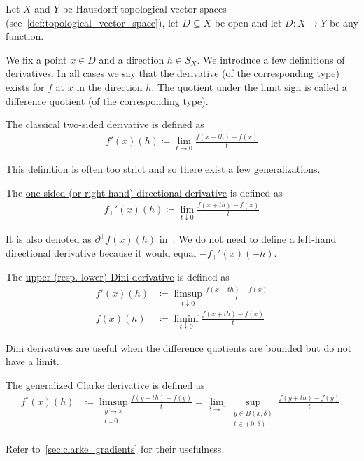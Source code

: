 Let $X$ and $Y$ be Hausdorff topological vector spaces (see~\cref{def:topological_vector_space}), let $D \subseteq X$ be open and let $D: X \to Y$ be any function.

\begin{definition}\label{def:derivatives}
  We fix a point $x \in D$ and a direction $h \in S_X$. We introduce a few definitions of derivatives. In all cases we say that \uline{the derivative (of the corresponding type) exists for $f$ at $x$ in the direction $h$}. The quotient under the limit sign is called a \uline{difference quotient} (of the corresponding type).

  \begin{defenum}
    \item\label{def:derivatives/classical} The classical \uline{two-sided derivative} is defined as
    \begin{align*}
      f'(x)(h) \coloneqq \lim_{t \to 0} \frac {f(x + th) - f(x)} t
    \end{align*}

    This definition is often too strict and so there exist a few generalizations.

    \item\label{def:derivatives/onesided}\cite[lemma 1.2]{Phelps1993} The \uline{one-sided (or right-hand) directional derivative} is defined as
    \begin{align*}
      f_+'(x)(h) \coloneqq \lim_{t \downarrow 0} \frac {f(x + th) - f(x)} t
    \end{align*}

    It is also denoted as $\partial^+ f(x)(h)$ in~\cite[lemma 1.2]{Phelps1993}. We do not need to define a left-hand directional derivative because it would equal $-f_+'(x)(-h)$.

    \item\label{def:derivatives/dini}\cite[definition 11.18]{Clarke2013} The \uline{upper (resp. lower) Dini derivative} is defined as
    \begin{align*}
      \overline f'(x)(h) &\coloneqq \limsup_{t \downarrow 0} \frac {f(x + th) - f(x)} t
      \\
      \underline f(x)(h) &\coloneqq \liminf_{t \downarrow 0} \frac {f(x + th) - f(x)} t
    \end{align*}

    Dini derivatives are useful when the difference quotients are bounded but do not have a limit.

    \item\label{def:derivatives/clarke}\cite[Section 10.1]{Clarke2013} The \uline{generalized Clarke derivative} is defined as
    \begin{align*}
      f^\circ(x)(h)
      &\coloneqq
      \limsup_{\substack{y \to x \\ t \downarrow 0}} \frac {f(y + th) - f(y)} t
      =
      \lim_{\delta \to 0} \sup_{\substack{y \in B(x, \delta) \\ t \in (0, \delta)}} \frac {f(y + th) - f(y)} t.
    \end{align*}

    Refer to~\cref{sec:clarke_gradients} for their usefulness.
  \end{defenum}
\end{definition}

